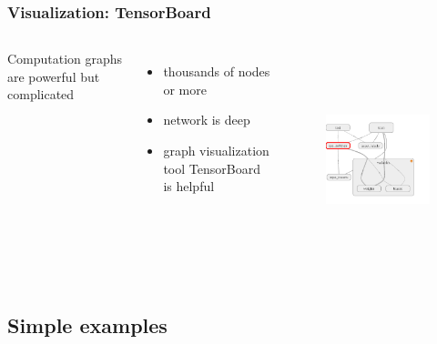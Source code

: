 \begin{frame}
  \MyLogo
  \frametitle{Visualization: TensorBoard}  

\begin{columns}
\scriptsize{
Computation graphs are powerful but complicated
\begin{itemize}
\item  thousands of nodes or more 
\item  network is deep
\item  graph visualization tool TensorBoard is helpful
\end{itemize}
}
%
\begin{figure}[htbp] 
   \includegraphics[height=2.5in]{figures/graphvisualization.png} 
\end{figure}
\end{columns}

\end{frame}

\subsection{Simple examples}

